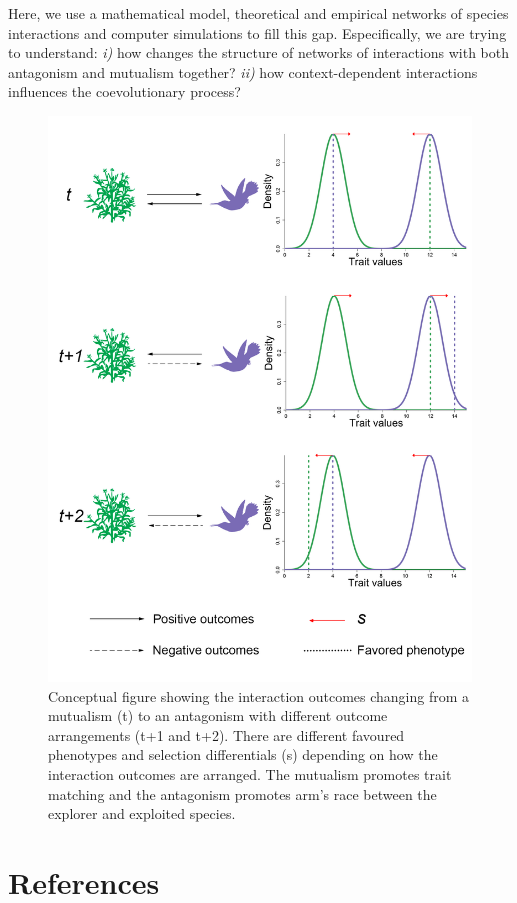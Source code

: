 \documentclass[a4paper, 12pt]{article}
\begin{document}
Here, we use a mathematical model, theoretical and empirical networks of species interactions and computer simulations to fill this gap. Especifically, we are trying to understand: \textit{i)} how changes the structure of networks of interactions with both antagonism and mutualism together? \textit{ii)} how context-dependent interactions influences the coevolutionary process?

\begin{figure}
\linespread{1.0}
\includegraphics[width=\textwidth]{Fig1_ConDep.png}
\caption{Conceptual figure showing the interaction outcomes changing from a mutualism (t) to an antagonism with different outcome arrangements (t+1 and t+2). There are different favoured phenotypes and selection differentials (s) depending on how the interaction outcomes are arranged. The mutualism promotes trait matching and the antagonism promotes arm's race between the explorer and exploited species.}
\label{fig1}
\end{figure}

\nolinenumbers
\section{References}
\end{document}

